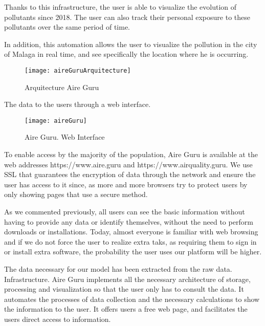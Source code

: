 Thanks to this infrastructure, the user is able to visualize the evolution of pollutants since 2018. The user can also track their personal exposure
 to these pollutants over the same period of time.

In addition, this automation allows the user to visualize the pollution in the city of Malaga in real time, and see specifically the location where he is 
occurring. \\
\newpage

\begin{figure}[ht]
    \centering
    \texttt{[image: aireGuruArquitecture]}
    \caption{Arquitecture Aire Guru}
\end{figure}

The data to the users through a web interface. \\

\begin{figure}[ht]
    \centering
    \texttt{[image: aireGuru]}
    \caption{Aire Guru. Web Interface}
\end{figure}

To enable access by the majority of the population, Aire Guru is available at the web addresses https://www.aire.guru and https://www.airquality.guru.
We use SSL that guarantees the encryption of data through the network and ensure the user has access to it since, as more and more browsers try to protect 
users by only showing pages that use a secure method.

As we commented previously, all users can see the basic information without having to provide any data or identify themselves, without the need to
perform downloads or installations. Today, almost everyone is familiar with web browsing and if we do not force the user to realize extra taks, as 
requiring them to sign in or install extra software, the probability the user uses our platform will be higher. 


\begin{itemize}
\done The data necessary for our model has been extracted from the raw data.
\done Infrastructure. Aire Guru implements all the necessary architecture of storage, processing and visualization so that the user only has to consult
the data.
\done It automates the processes of data collection and the necessary calculations to show the information to the user.
\done It offers users a free web page, and facilitates the users direct access to information.
\end{itemize}

